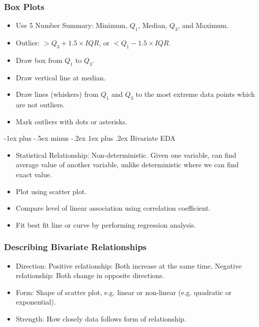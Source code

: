 \documentclass[10pt, landscape]{article}
\makeatletter
\renewcommand{\subsection}{\@startsection{subsection}{3}{0mm}%
                                {-1ex plus -.5ex minus -.2ex}%
                                {1ex plus .2ex}%
                                {\normalfont\small\bfseries}}%
\makeatother
\begin{document}
\begin{multicols*}{3}
\subsubsection{Box Plots}
\begin{itemize}
    \item Use 5 Number Summary: Minimum, $Q_1$, Median, $Q_3$, and Maximum.
    \item Outlier: $> Q_3+1.5 \times IQR$, or $< Q_1-1.5 \times IQR$.
    \item Draw box from $Q_1$ to $Q_3$.
    \item Draw vertical line at median.
    \item Draw lines (whiskers) from $Q_1$ and $Q_3$ to the most extreme data points which are not outliers.
    \item Mark outliers with dots or asterisks.
\end{itemize}

\subsection{Bivariate EDA}
\begin{itemize}
    \item Statistical Relationship: Non-deterministic. Given one variable, can find average value of another variable, unlike deterministic where we can find exact value.
    \item Plot using scatter plot.
    \item Compare level of linear association using correlation coefficient.
    \item Fit best fit line or curve by performing regression analysis.
\end{itemize}

\subsubsection{Describing Bivariate Relationships}
\begin{itemize}
    \item Direction: Positive relationship: Both increase at the same time, Negative relationship: Both change in opposite directions.
    \item Form: Shape of scatter plot, e.g. linear or non-linear (e.g. quadratic or exponential).
    \item Strength: How closely data follows form of relationship.
\end{itemize}


\end{multicols*}
\end{document}
